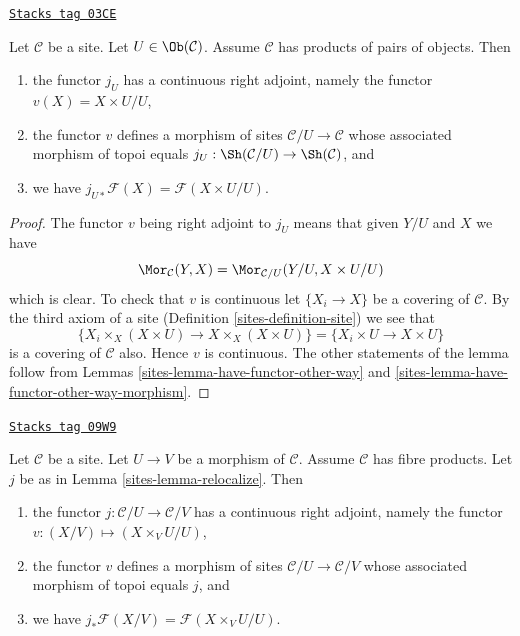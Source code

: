 \begin{lemma}
\label{sites-lemma-localize-given-products}
\href{https://stacks.math.columbia.edu/tag/03CE}{\texttt{Stacks tag 03CE}}

Let $\mathcal{C}$ be a site.
Let $U \in \Ob(\mathcal{C})$.
Assume $\mathcal{C}$ has products of pairs of objects.
Then
\begin{enumerate}
\item the functor $j_U$ has a continuous right adjoint,
namely the functor $v(X) = X \times U / U$,
\item the functor $v$ defines a morphism of sites
$\mathcal{C}/U \to \mathcal{C}$ whose associated morphism of topoi equals
$j_U : \Sh(\mathcal{C}/U) \to \Sh(\mathcal{C})$, and
\item we have $j_{U*}\mathcal{F}(X) = \mathcal{F}(X \times U/U)$.
\end{enumerate}
\end{lemma}

\begin{proof}

The functor $v$ being right adjoint to $j_U$ means that given $Y/U$ and $X$
we have
$$
\Mor_\mathcal{C}(Y, X)
=
\Mor_{\mathcal{C}/U}(Y/U, X \times U/U)
$$
which is clear. To check that $v$ is continuous let $\{X_i \to X\}$ be
a covering of $\mathcal{C}$. By the third axiom of a site
(Definition \ref{sites-definition-site})
we see that
$$
\{X_i \times_X (X \times U) \to X \times_X (X \times U)\}
=
\{X_i \times U \to X \times U\}
$$
is a covering of $\mathcal{C}$ also. Hence $v$ is continuous. The other
statements of the lemma follow from Lemmas \ref{sites-lemma-have-functor-other-way}
and \ref{sites-lemma-have-functor-other-way-morphism}.
\end{proof}

\begin{lemma}
\label{sites-lemma-relocalize-given-fibre-products}
\href{https://stacks.math.columbia.edu/tag/09W9}{\texttt{Stacks tag 09W9}}

Let $\mathcal{C}$ be a site. Let $U \to V$ be a morphism of $\mathcal{C}$.
Assume $\mathcal{C}$ has fibre products. Let $j$ be as in
Lemma \ref{sites-lemma-relocalize}. Then
\begin{enumerate}
\item the functor $j : \mathcal{C}/U \to \mathcal{C}/V$
has a continuous right adjoint, namely the functor
$v : (X/V) \mapsto (X \times_V U/U)$,
\item the functor $v$ defines a morphism of sites
$\mathcal{C}/U \to \mathcal{C}/V$ whose associated morphism of topoi equals
$j$, and
\item we have $j_*\mathcal{F}(X/V) = \mathcal{F}(X \times_V U/U)$.
\end{enumerate}
\end{lemma}

